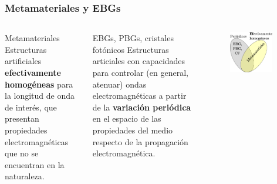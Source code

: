 \documentclass{beamer}
\begin{document}
	\begin{frame}
		\frametitle{Metamateriales y EBGs}
		\begin{columns}[c]
			\begin{block}{Metamateriales}
				Estructuras artificiales \textbf{efectivamente homogéneas} para la longitud de onda de interés, que presentan propiedades electromagnéticas que no se encuentran en la naturaleza.
			\end{block}
		
			\begin{block}{EBGs, PBGs, cristales fotónicos}
				Estructuras articiales con capacidades para controlar (en general, atenuar) ondas electromagnéticas a partir de la \textbf{variación periódica} en el espacio de las propiedades del medio respecto de la propagación electromagnética.
			\end{block}
		
			\begin{figure} [H]
				\includegraphics[width=0.9\textwidth]{Presentacion/ebg-metamateriales.pdf}
			\end{figure}
		\end{columns}
	\end{frame}
	
\end{document}
